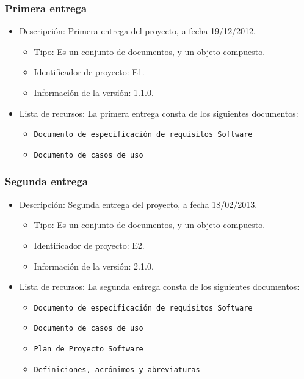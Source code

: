 \documentclass[spanish,a4paper,11pt, twoside]{report}	%
\begin{document}
			\subsubsection{\underline{Primera entrega}}
			\begin{itemize}	
				\item{Descripción:} Primera entrega del proyecto, a fecha 19/12/2012.
					\begin{itemize}	
						\item{Tipo:} Es un conjunto de documentos, y un objeto compuesto. 
						\item{Identificador de proyecto:} E1.
						\item{Información de la versión:} 1.1.0.
					\end{itemize}	
				\item{Lista de recursos:} La primera entrega consta de los siguientes documentos:
					\begin{itemize}	
						\item \texttt{Documento de especificación de requisitos Software} 
						\item \texttt{Documento de casos de uso} 
					\end{itemize}
			\end{itemize}	

			\subsubsection{\underline{Segunda entrega}}
			\begin{itemize}	
				\item{Descripción:} Segunda entrega del proyecto, a fecha 18/02/2013.
					\begin{itemize}	
						\item{Tipo:} Es un conjunto de documentos, y un objeto compuesto. 
						\item{Identificador de proyecto:} E2.
						\item{Información de la versión:} 2.1.0.
					\end{itemize}	
				\item{Lista de recursos:} La segunda entrega consta de los siguientes documentos:
					\begin{itemize}	
						\item \texttt{Documento de especificación de requisitos Software}
						\item \texttt{Documento de casos de uso}
						\item \texttt{Plan de Proyecto Software}
						\item \texttt{Definiciones, acrónimos y abreviaturas}
					\end{itemize}
			\end{itemize}
\end{document}
